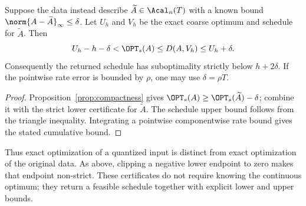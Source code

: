 \begin{corollary}\label{cor:coarse-perturbation}
Suppose the data instead describe $\widetilde A\in\Acal_n(T)$ with a known
bound $\norm{A-\widetilde A}_\infty\le\delta$. Let $U_h$ and $V_h$ be
the exact coarse optimum and schedule for $\widetilde A$. Then
\begin{equation}\label{eq:perturbed-certificate}
 U_h-h-\delta<\OPT_s(A)\le D(A,V_h)\le U_h+\delta.
\end{equation}
Consequently the returned schedule has suboptimality strictly below
$h+2\delta$. If the pointwise rate error is bounded by $\rho$, one may
use $\delta=\rho T$.
\end{corollary}
\begin{proof}
Proposition~\ref{prop:compactness} gives
$\OPT_s(A)\ge\OPT_s(\widetilde A)-\delta$; combine it with the strict
lower certificate for $\widetilde A$. The schedule upper bound follows
from the triangle inequality. Integrating a pointwise componentwise rate
bound gives the stated cumulative bound.
\end{proof}
Thus exact optimization of a quantized input is distinct from exact
optimization of the original data. As above, clipping a negative lower
endpoint to zero makes that endpoint non-strict. These certificates do not
require knowing the continuous optimum; they return a feasible schedule
together with explicit lower and upper bounds.
